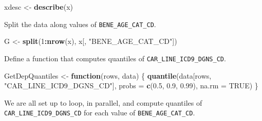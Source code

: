 \documentclass[]{book}
\newenvironment{Shaded}{\begin{snugshade}}{\end{snugshade}}
\newcommand{\KeywordTok}[1]{\textcolor[rgb]{0.13,0.29,0.53}{\textbf{#1}}}
\newcommand{\DataTypeTok}[1]{\textcolor[rgb]{0.13,0.29,0.53}{#1}}
\newcommand{\DecValTok}[1]{\textcolor[rgb]{0.00,0.00,0.81}{#1}}
\newcommand{\FloatTok}[1]{\textcolor[rgb]{0.00,0.00,0.81}{#1}}
\newcommand{\StringTok}[1]{\textcolor[rgb]{0.31,0.60,0.02}{#1}}
\newcommand{\OtherTok}[1]{\textcolor[rgb]{0.56,0.35,0.01}{#1}}
\newcommand{\ControlFlowTok}[1]{\textcolor[rgb]{0.13,0.29,0.53}{\textbf{#1}}}
\newcommand{\OperatorTok}[1]{\textcolor[rgb]{0.81,0.36,0.00}{\textbf{#1}}}
\newcommand{\NormalTok}[1]{#1}
\theoremstyle{definition}
\theoremstyle{definition}
\theoremstyle{definition}
\theoremstyle{remark}
\begin{document}
\begin{Shaded}
\begin{Highlighting}[]
\NormalTok{xdesc <-}\StringTok{ }\KeywordTok{describe}\NormalTok{(x) }
\end{Highlighting}
\end{Shaded}

Split the data along values of \texttt{BENE\_AGE\_CAT\_CD}.

\begin{Shaded}
\begin{Highlighting}[]
\NormalTok{G <-}\StringTok{ }\KeywordTok{split}\NormalTok{(}\DecValTok{1}\OperatorTok{:}\KeywordTok{nrow}\NormalTok{(x), x[, }\StringTok{"BENE_AGE_CAT_CD"}\NormalTok{]) }
\end{Highlighting}
\end{Shaded}

Define a function that computes quantiles of
\texttt{CAR\_LINE\_ICD9\_DGNS\_CD}.

\begin{Shaded}
\begin{Highlighting}[]
\NormalTok{GetDepQuantiles <-}\StringTok{ }\ControlFlowTok{function}\NormalTok{(rows, data) \{}
 \KeywordTok{quantile}\NormalTok{(data[rows, }\StringTok{"CAR_LINE_ICD9_DGNS_CD"}\NormalTok{], }\DataTypeTok{probs =} \KeywordTok{c}\NormalTok{(}\FloatTok{0.5}\NormalTok{, }\FloatTok{0.9}\NormalTok{, }\FloatTok{0.99}\NormalTok{),}
 \DataTypeTok{na.rm =} \OtherTok{TRUE}\NormalTok{)}
\NormalTok{\}}
\end{Highlighting}
\end{Shaded}

We are all set up to loop, in parallel, and compute quantiles of
\texttt{CAR\_LINE\_ICD9\_DGNS\_CD} for each value of
\texttt{BENE\_AGE\_CAT\_CD}.

\begin{Shaded}
\end{Shaded}
\end{document}

